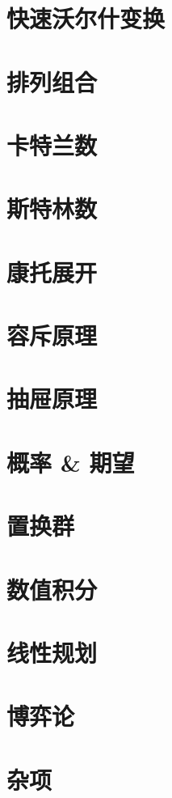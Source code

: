   \section{快速沃尔什变换}
  
  \section{排列组合}
  
  \section{卡特兰数}
  
  \section{斯特林数}
  
  \section{康托展开}
  
  \section{容斥原理}
  
  \section{抽屉原理}
  
\section{概率 \& 期望}

\section{置换群}

\section{数值积分}

\section{线性规划}

\section{博弈论}

\section{杂项}

